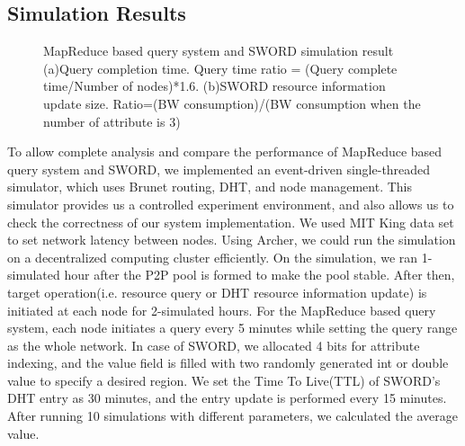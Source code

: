 \documentclass{acm_proc_article-sp}
\begin{document}
\subsection{Simulation Results}
\begin{figure}[t]
\centering
{}
\caption{MapReduce based query system and SWORD simulation result (a)Query completion time. Query time ratio = (Query complete time/Number of nodes)*1.6. 
(b)SWORD resource information update size. Ratio=(BW consumption)/(BW consumption when the number of attribute is 3)}
\end{figure}
To allow complete analysis and compare the performance of MapReduce based query system and SWORD, we implemented an event-driven single-threaded simulator, which uses Brunet\cite{brunet} routing, DHT, and node management.
This simulator provides us a controlled experiment environment, and also allows us to check the correctness of our system implementation. We used MIT King data set\cite{king} to set network latency between nodes.
Using Archer\cite{archer}, we could run the simulation on a decentralized computing cluster efficiently. 
On the simulation, we ran 1-simulated hour after the P2P pool is formed to make the pool stable. After then, target operation(i.e. resource query or DHT resource information update) is initiated at each node for 2-simulated hours.
For the MapReduce based query system, each node initiates a query every 5 minutes while setting the query range as the whole network. 
In case of SWORD, we allocated 4 bits for attribute indexing, and the value field is filled with two randomly generated int or double value to specify a desired region. 
We set the Time To Live(TTL) of SWORD's DHT entry as 30 minutes, and the entry update is performed every 15 minutes.
After running 10 simulations with different parameters, we calculated the average value.
\end{document}
